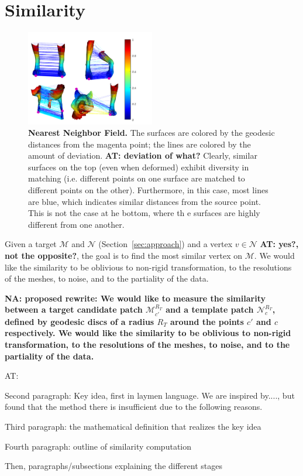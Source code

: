 \documentclass[10pt,twocolumn,letterpaper]{article}
\newcommand{\colornote}[3]{{\color{#1}\bf{#2: #3}\normalfont}}
\newcommand{\colornote}[3]{}
\newcommand {\ayellet}[1]{\colornote{blue}{AT}{#1}}
\newcommand {\nadav}[1]{\colornote{red}{NA}{#1}}
\begin{document}
\section{Similarity}
\label{sec:similarity}
\begin{figure}[htb]
	\includegraphics[width=0.5\textwidth]{figures/DDIS2.png}
	\caption{{\bf Nearest Neighbor Field.} 
		The surfaces are colored by the geodesic distances from the magenta point; the lines are colored by the amount of deviation. \ayellet{deviation of what?} 
		Clearly, similar surfaces on the top (even when deformed) exhibit diversity in matching (i.e. different points on one surface are matched to different points on the other).
		Furthermore, in this case, most lines are blue, which indicates similar distances from the source point.
		This is not the case at he bottom, where th e surfaces are highly different from one another.
		}
		\label{fig:NNF}
\end{figure}

Given a target $\mathcal{M}$  and $\mathcal{N}$ (Section~\ref{sec:approach}) and a vertex $v \in  \mathcal{N}$ \ayellet{yes?, not the opposite?}, the goal is to find the most similar vertex on $\mathcal{M}$.
We would like the similarity to be oblivious to non-rigid transformation, to the resolutions of the meshes, to noise, and to the partiality of the data.

 \nadav{proposed rewrite: We would like to measure the similarity between a target candidate patch ${\mathcal{M}^{R_T}_{c'}}$ and a template patch ${\mathcal{N}^{R_T}_{c}}$, defined by  geodesic discs of a radius $R_T$ around the points $c'$ and $c$ respectively. We would like the similarity to be oblivious to non-rigid transformation, to the resolutions of the meshes, to noise, and to the partiality of the data.}
\ayellet{

Second paragraph: Key idea, first in laymen language.
We are inspired by...., but found that the method there is insufficient due to the following reasons.

Third paragraph: the mathematical definition that realizes the key idea

Fourth paragraph: outline of similarity computation

Then, paragraphs/subsections explaining the different stages
}
\end{document}
